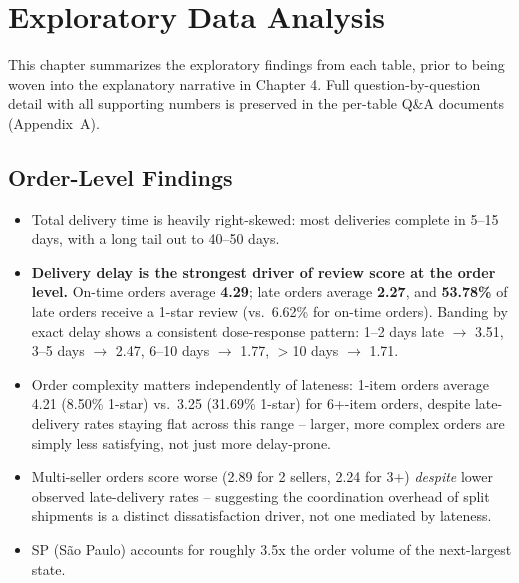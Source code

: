 \documentclass[11pt,a4paper]{report}
\begin{document}
\chapter{Exploratory Data Analysis}

This chapter summarizes the exploratory findings from each table, prior to being woven into the
explanatory narrative in Chapter 4. Full question-by-question detail with all supporting numbers
is preserved in the per-table Q\&A documents (Appendix~A).

\section{Order-Level Findings}
\begin{itemize}
    \item Total delivery time is heavily right-skewed: most deliveries complete in 5--15 days,
        with a long tail out to 40--50 days.
    \item \textbf{Delivery delay is the strongest driver of review score at the order level.}
        On-time orders average \textbf{4.29}; late orders average \textbf{2.27}, and \textbf{53.78\%}
        of late orders receive a 1-star review (vs.\ 6.62\% for on-time orders). Banding by exact
        delay shows a consistent dose-response pattern: 1--2 days late $\rightarrow$ 3.51,
        3--5 days $\rightarrow$ 2.47, 6--10 days $\rightarrow$ 1.77, $>$10 days $\rightarrow$ 1.71.
    \item Order complexity matters independently of lateness: 1-item orders average 4.21 (8.50\%
        1-star) vs.\ 3.25 (31.69\% 1-star) for 6+-item orders, despite late-delivery rates staying
        flat across this range -- larger, more complex orders are simply less satisfying, not just
        more delay-prone.
    \item Multi-seller orders score worse (2.89 for 2 sellers, 2.24 for 3+) \emph{despite} lower
        observed late-delivery rates -- suggesting the coordination overhead of split shipments is
        a distinct dissatisfaction driver, not one mediated by lateness.
    \item SP (S\~ao Paulo) accounts for roughly 3.5x the order volume of the next-largest state.
\end{itemize}
\end{document}
